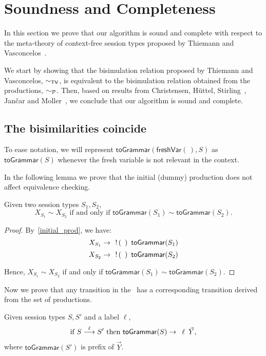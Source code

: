 \section{Soundness and Completeness}
\label{sec:soundness}

In this section we prove that our algorithm is sound and complete 
with respect to the meta-theory of context-free session types proposed 
by Thiemann and Vasconcelos~\cite{thiemann2016context}.

We start by showing that the bisimulation relation proposed by 
Thiemann and Vasconcelos, $\TypeEquiv$, is equivalent to the 
bisimulation relation obtained from the productions, $\ProdEquiv$. 
Then, based on results from Christensen, H{\"{u}}ttel, 
Stirling~\cite{DBLP:journals/iandc/ChristensenHS95}, Jan{\v{c}}ar 
and Moller~\cite{janvcar1999techniques}, we conclude that our algorithm 
is sound and complete.

\subsection{The bisimilarities coincide}

To ease notation, we will represent $\mathsf{toGrammar}
(\mathsf{freshVar}(\,),S)$ as $\mathsf{toGrammar}(S)$ whenever 
the fresh variable is not relevant in the context.

In the following lemma we prove that the initial (dummy) production 
does not affect equivalence checking.
\begin{lemma}
	Given two session types $S_1, S_2$, 
	\[ X_{S_1} \sim X_{S_2}  \text{ if and only if } 
	\mathsf{toGrammar}(S_1) \sim \mathsf{toGrammar}(S_2).\]
\end{lemma}

\begin{proof}
	By~\eqref{initial_prod}, we have:
	\[ X_{S_1}  \rightarrow \enspace \initialProd\enspace \mathsf{toGrammar}(S_1) 	\]
    \[ X_{S_2}  \rightarrow \enspace \initialProd\enspace \mathsf{toGrammar}(S_2) 	\]

Hence, $X_{S_1}\sim X_{S_2}$ if and only if 
$\mathsf{toGrammar}(S_1) \sim \mathsf{toGrammar}(S_2)$.
\end{proof}

Now we prove that any transition in the \LTS\ has a 
corresponding transition derived from the set of productions.

\begin{lemma}
Given session types $S,S'$ and a label $\ell$,
	\[ \text{if } S \LTSderives[\ell] S' \text{ then } 
	\mathsf{toGrammar}(S) \rightarrow \enspace \ell \enspace \vec Y, \]
	where $\mathsf{toGrammar}(S')$ is prefix of $\vec Y$.
\end{lemma}

